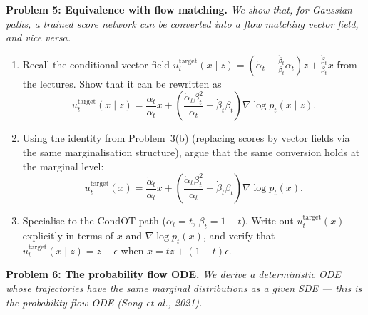 \documentclass[11pt]{article}
\theoremstyle{definition}
\theoremstyle{remark}
\begin{document}
\textbf{Problem 5: Equivalence with flow matching.} \textit{We show that, for Gaussian paths, a trained score network can be converted into a flow matching vector field, and vice versa.}

\begin{enumerate}\renewcommand{\labelenumi}{(\alph{enumi})}
\item Recall the conditional vector field $u_t^{\mathrm{target}}(x \mid z) = (\dot\alpha_t - \frac{\dot\beta_t}{\beta_t}\alpha_t) z + \frac{\dot\beta_t}{\beta_t} x$ from the lectures. Show that it can be rewritten as
\[
u_t^{\mathrm{target}}(x \mid z) = \frac{\dot\alpha_t}{\alpha_t} x + \left(\frac{\dot\alpha_t \beta_t^2}{\alpha_t} - \dot\beta_t \beta_t\right) \nabla \log p_t(x \mid z).
\]

\item Using the identity from Problem~3(b) (replacing scores by vector fields via the same marginalisation structure), argue that the same conversion holds at the marginal level:
\[
\boxed{u_t^{\mathrm{target}}(x) = \frac{\dot\alpha_t}{\alpha_t} x + \left(\frac{\dot\alpha_t \beta_t^2}{\alpha_t} - \dot\beta_t \beta_t\right) \nabla \log p_t(x).}
\]

\item Specialise to the CondOT path ($\alpha_t = t$, $\beta_t = 1 - t$). Write out $u_t^{\mathrm{target}}(x)$ explicitly in terms of $x$ and $\nabla \log p_t(x)$, and verify that $u_t^{\mathrm{target}}(x \mid z) = z - \epsilon$ when $x = tz + (1-t)\epsilon$.
\end{enumerate}

\textbf{Problem 6: The probability flow ODE.} \textit{We derive a deterministic ODE whose trajectories have the same marginal distributions as a given SDE --- this is the probability flow ODE (Song et al., 2021).}
\end{document}
